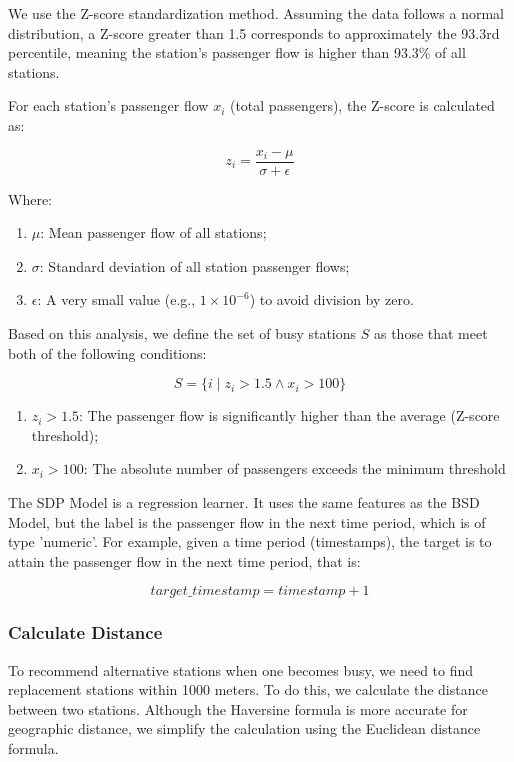 \documentclass[11pt]{article} %
\begin{document}
We use the Z-score standardization method. Assuming the data follows a normal distribution, a Z-score greater than 1.5 corresponds to approximately the 93.3rd percentile, meaning the station’s passenger flow is higher than 93.3\% of all stations.

For each station's passenger flow $x_i $ (total passengers), the Z-score is calculated as:

\begin{equation}
	z_i = \frac{x_i - \mu}{\sigma + \epsilon}
	\label{eq:zscore}
\end{equation}

Where:

\begin{enumerate}
\item $\mu$: Mean passenger flow of all stations;
\item $\sigma$: Standard deviation of all station passenger flows;
\item $\epsilon$: A very small value (e.g., $1 \times 10^{-6}$) to avoid division by zero.
\end{enumerate}

Based on this analysis, we define the set of busy stations $S$ as those that meet both of the following conditions:

\begin{equation}
	S = \{ i \mid z_i > 1.5 \land x_i > 100 \}
\end{equation}

\begin{enumerate}
\item $z_i > 1.5$: The passenger flow is significantly higher than the average (Z-score threshold);
\item $x_i > 100$: The absolute number of passengers exceeds the minimum threshold
\end{enumerate}

The SDP Model is a regression learner. It uses the same features as the BSD Model, but the label is the passenger flow in the next time period, which is of type 'numeric'. For example, given a time period (timestamps), the target is to attain the passenger flow in the next time period, that is:

\begin{equation}
	target\_timestamp = timestamp + 1
\end{equation}

\subsubsection{Calculate Distance}
To recommend alternative stations when one becomes busy, we need to find replacement stations within 1000 meters. To do this, we calculate the distance between two stations. Although the Haversine formula is more accurate for geographic distance, we simplify the calculation using the Euclidean distance formula.
\end{document}

